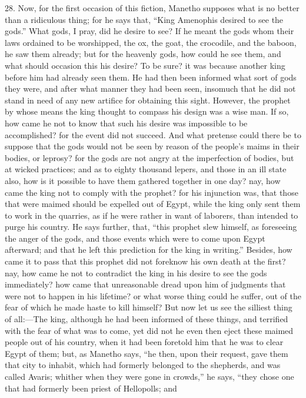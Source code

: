28. Now, for the first occasion of this fiction, Manetho supposes what is
no better than a ridiculous thing; for he says that, ``King Amenophis
desired to see the gods.'' What gods, I pray, did he desire to see? If he
meant the gods whom their laws ordained to be worshipped, the ox, the
goat, the crocodile, and the baboon, he saw them already; but for the
heavenly gods, how could he see them, and what should occasion this his
desire? To be sure? it was because another king before him had already
seen them. He had then been informed what sort of gods they were, and
after what manner they had been seen, insomuch that he did not stand in
need of any new artifice for obtaining this sight. However, the prophet by
whose means the king thought to compass his design was a wise man. If so,
how came he not to know that such his desire was impossible to be
accomplished? for the event did not succeed. And what pretense could there
be to suppose that the gods would not be seen by reason of the people's
maims in their bodies, or leprosy? for the gods are not angry at the
imperfection of bodies, but at wicked practices; and as to eighty thousand
lepers, and those in an ill state also, how is it possible to have them
gathered together in one day? nay, how came the king not to comply with
the prophet? for his injunction was, that those that were maimed should be
expelled out of Egypt, while the king only sent them to work in the
quarries, as if he were rather in want of laborers, than intended to purge
his country. He says further, that, ``this prophet slew himself, as
foreseeing the anger of the gods, and those events which were to come upon
Egypt afterward; and that he left this prediction for the king in
writing.'' Besides, how came it to pass that this prophet did not foreknow
his own death at the first? nay, how came he not to contradict the king in
his desire to see the gods immediately? how came that unreasonable dread
upon him of judgments that were not to happen in his lifetime? or what
worse thing could he suffer, out of the fear of which he made haste to
kill himself? But now let us see the silliest thing of all:—The
king, although he had been informed of these things, and terrified with
the fear of what was to come, yet did not he even then eject these maimed
people out of his country, when it had been foretold him that he was to
clear Egypt of them; but, as Manetho says, ``he then, upon their request,
gave them that city to inhabit, which had formerly belonged to the
shepherds, and was called Avaris; whither when they were gone in crowds,''
he says, ``they chose one that had formerly been priest of Hellopolls; and
